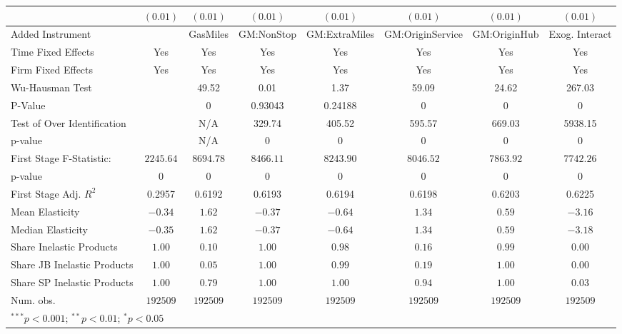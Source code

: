 \begin{tabular}{l c c c c c c c}
                             & $(0.01)$      & $(0.01)$      & $(0.01)$      & $(0.01)$      & $(0.01)$         & $(0.01)$      & $(0.01)$       \\
\midrule
Added Instrument             &               & GasMiles      & GM:NonStop    & GM:ExtraMiles & GM:OriginService & GM:OriginHub  & Exog. Interact \\
Time Fixed Effects           & Yes           & Yes           & Yes           & Yes           & Yes              & Yes           & Yes            \\
Firm Fixed Effects           & Yes           & Yes           & Yes           & Yes           & Yes              & Yes           & Yes            \\
Wu-Hausman Test              &               & 49.52         & 0.01          & 1.37          & 59.09            & 24.62         & 267.03         \\
P-Value                      &               & 0             & 0.93043       & 0.24188       & 0                & 0             & 0              \\
Test of Over Identification  &               & N/A           & 329.74        & 405.52        & 595.57           & 669.03        & 5938.15        \\
p-value                      &               & N/A           & 0             & 0             & 0                & 0             & 0              \\
First Stage F-Statistic:     & $2245.64$     & $8694.78$     & $8466.11$     & $8243.90$     & $8046.52$        & $7863.92$     & $7742.26$      \\
p-value                      & $0$           & $0$           & $0$           & $0$           & $0$              & $0$           & $0$            \\
First Stage Adj. $R^2$       & 0.2957        & 0.6192        & 0.6193        & 0.6194        & 0.6198           & 0.6203        & 0.6225         \\
Mean Elasticity              & $-0.34$       & $1.62$        & $-0.37$       & $-0.64$       & $1.34$           & $0.59$        & $-3.16$        \\
Median Elasticity            & $-0.35$       & $1.62$        & $-0.37$       & $-0.64$       & $1.34$           & $0.59$        & $-3.18$        \\
Share Inelastic Products     & $1.00$        & $0.10$        & $1.00$        & $0.98$        & $0.16$           & $0.99$        & $0.00$         \\
Share JB Inelastic Products  & $1.00$        & $0.05$        & $1.00$        & $0.99$        & $0.19$           & $1.00$        & $0.00$         \\
Share SP Inelastic Products  & $1.00$        & $0.79$        & $1.00$        & $1.00$        & $0.94$           & $1.00$        & $0.03$         \\
Num. obs.                    & $192509$      & $192509$      & $192509$      & $192509$      & $192509$         & $192509$      & $192509$       \\
\bottomrule
\multicolumn{8}{l}{\scriptsize{$^{***}p<0.001$; $^{**}p<0.01$; $^{*}p<0.05$}}
\end{tabular}
